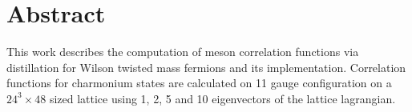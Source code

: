 \section*{Abstract}

This work describes the computation of meson correlation functions via distillation for Wilson twisted mass fermions and its implementation. Correlation functions for charmonium states are calculated on 11 gauge configuration on a $24^3 \times 48$ sized lattice using 1, 2, 5 and 10 eigenvectors of the lattice lagrangian. 
